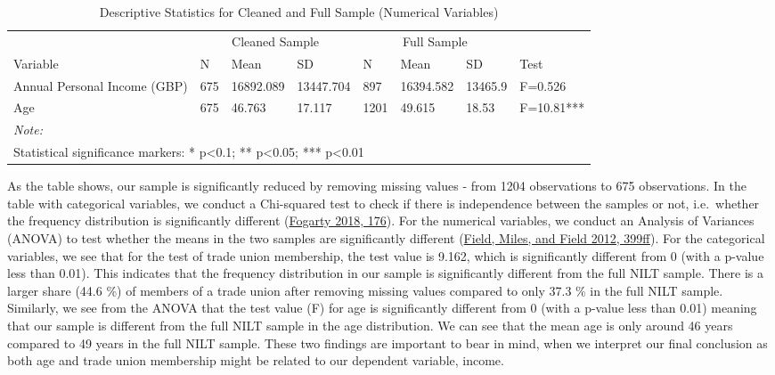 \documentclass[
]{article}
\begin{document}
\begin{table}[H]

\caption{\label{tab:unnamed-chunk-1}Descriptive Statistics for Cleaned and Full Sample (Numerical Variables)}
\centering
\begin{tabular}[t]{llllllll}
\toprule
\multicolumn{1}{c}{ } & \multicolumn{3}{c}{Cleaned Sample} & \multicolumn{3}{c}{Full Sample} & \multicolumn{1}{c}{ } \\
\cmidrule(l{3pt}r{3pt}){2-4} \cmidrule(l{3pt}r{3pt}){5-7}
Variable & N & Mean & SD & N & Mean & SD & Test\\
\midrule
Annual Personal Income (GBP) & 675 & 16892.089 & 13447.704 & 897 & 16394.582 & 13465.9 & F=0.526\\
Age & 675 & 46.763 & 17.117 & 1201 & 49.615 & 18.53 & F=10.81***\\
\bottomrule
\multicolumn{8}{l}{\rule{0pt}{1em}\textit{Note: }}\\
\multicolumn{8}{l}{\rule{0pt}{1em}Statistical significance markers: * p<0.1; ** p<0.05; *** p<0.01}\\
\end{tabular}
\end{table}

As the table shows, our sample is significantly reduced by removing
missing values - from 1204 observations to 675 observations. In the
table with categorical variables, we conduct a Chi-squared test to check
if there is independence between the samples or not, i.e.~whether the
frequency distribution is significantly different
(\protect\hyperlink{ref-fogarty2018quantitative}{Fogarty 2018, 176}).
For the numerical variables, we conduct an Analysis of Variances (ANOVA)
to test whether the means in the two samples are significantly different
(\protect\hyperlink{ref-field2012discovering}{Field, Miles, and Field
2012, 399ff}). For the categorical variables, we see that for the test
of trade union membership, the test value is 9.162, which is
significantly different from 0 (with a p-value less than 0.01). This
indicates that the frequency distribution in our sample is significantly
different from the full NILT sample. There is a larger share (44.6 \%)
of members of a trade union after removing missing values compared to
only 37.3 \% in the full NILT sample. Similarly, we see from the ANOVA
that the test value (F) for age is significantly different from 0 (with
a p-value less than 0.01) meaning that our sample is different from the
full NILT sample in the age distribution. We can see that the mean age
is only around 46 years compared to 49 years in the full NILT sample.
These two findings are important to bear in mind, when we interpret our
final conclusion as both age and trade union membership might be related
to our dependent variable, income.
\end{document}
